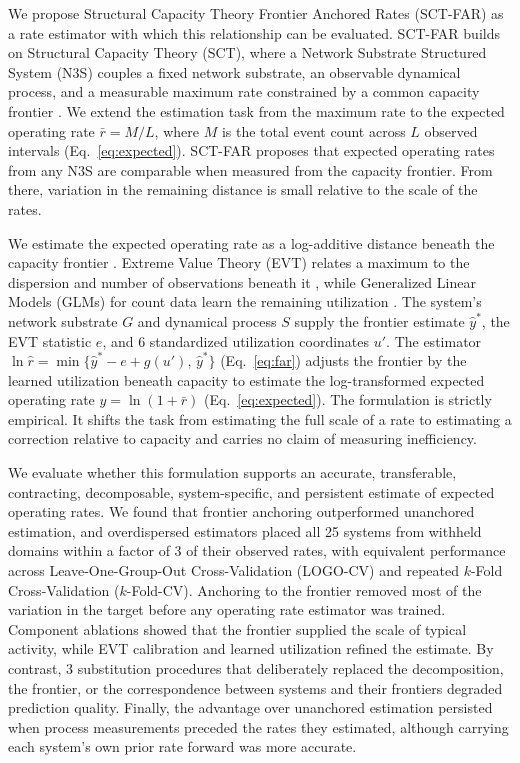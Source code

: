 \documentclass{article}
\begin{document}
We propose Structural Capacity Theory Frontier Anchored Rates (SCT-FAR) as a rate estimator with which this relationship can be evaluated. SCT-FAR builds on Structural Capacity Theory (SCT), where a Network Substrate Structured System (N3S) couples a fixed network substrate, an observable dynamical process, and a measurable maximum rate constrained by a common capacity frontier \citep{ref122}. We extend the estimation task from the maximum rate to the expected operating rate $\bar{r} = M/L$, where $M$ is the total event count across $L$ observed intervals (Eq.~\eqref{eq:expected}). SCT-FAR proposes that expected operating rates from any N3S are comparable when measured from the capacity frontier. From there, variation in the remaining distance is small relative to the scale of the rates.

We estimate the expected operating rate as a log-additive distance beneath the capacity frontier \citep{ref19,ref21,ref23}. Extreme Value Theory (EVT) relates a maximum to the dispersion and number of observations beneath it \citep{ref136,ref137,ref58,ref179,ref123}, while Generalized Linear Models (GLMs) for count data learn the remaining utilization \citep{ref138,ref177,ref178}. The system's network substrate $G$ and dynamical process $S$ supply the frontier estimate $\widehat{y}^*$, the EVT statistic $e$, and 6 standardized utilization coordinates $u'$. The estimator $\ln \widehat{r} = \min\{\widehat{y}^* - e + g(u'),\, \widehat{y}^*\}$ (Eq.~\eqref{eq:far}) adjusts the frontier by the learned utilization beneath capacity to estimate the log-transformed expected operating rate $y = \ln(1 + \bar{r})$ (Eq.~\eqref{eq:expected}). The formulation is strictly empirical. It shifts the task from estimating the full scale of a rate to estimating a correction relative to capacity and carries no claim of measuring inefficiency.

We evaluate whether this formulation supports an accurate, transferable, contracting, decomposable, system-specific, and persistent estimate of expected operating rates. We found that frontier anchoring outperformed unanchored estimation, and overdispersed estimators placed all 25 systems from withheld domains within a factor of 3 of their observed rates, with equivalent performance across Leave-One-Group-Out Cross-Validation (LOGO-CV) and repeated $k$-Fold Cross-Validation ($k$-Fold-CV). Anchoring to the frontier removed most of the variation in the target before any operating rate estimator was trained. Component ablations showed that the frontier supplied the scale of typical activity, while EVT calibration and learned utilization refined the estimate. By contrast, 3 substitution procedures that deliberately replaced the decomposition, the frontier, or the correspondence between systems and their frontiers degraded prediction quality. Finally, the advantage over unanchored estimation persisted when process measurements preceded the rates they estimated, although carrying each system's own prior rate forward was more accurate.
\clearpage
\end{document}
